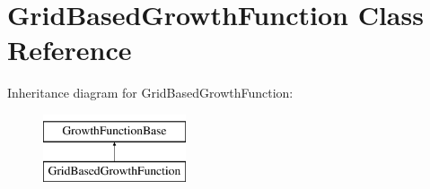 \hypertarget{classGridBasedGrowthFunction}{}\section{Grid\+Based\+Growth\+Function Class Reference}
\label{classGridBasedGrowthFunction}
Inheritance diagram for Grid\+Based\+Growth\+Function\+:\begin{figure}[H]
\begin{center}
\leavevmode
\includegraphics[height=2.000000cm]{classGridBasedGrowthFunction}
\end{center}
\end{figure}

